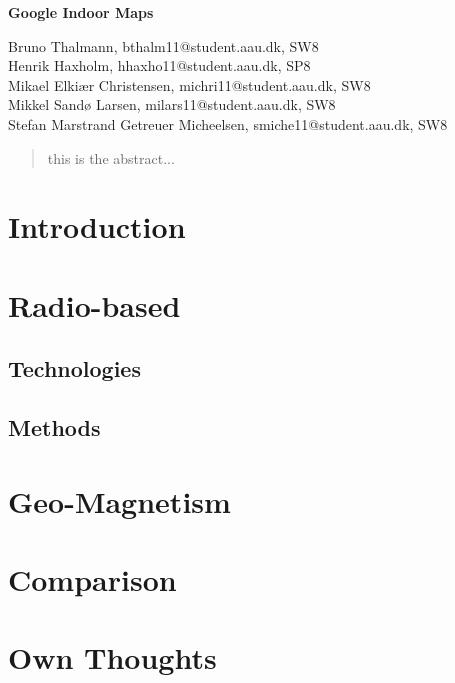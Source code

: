 \documentclass[12pt,a4paper]{article}
\begin{document}
\begin{center}
\bigskip\bigskip
{\Large\bf Google Indoor Maps}
\bigskip\bigskip


Bruno Thalmann, bthalm11@student.aau.dk, SW8\\
Henrik Haxholm, hhaxho11@student.aau.dk, SP8\\
Mikael Elkiær Christensen, michri11@student.aau.dk, SW8\\
Mikkel Sandø Larsen, milars11@student.aau.dk, SW8\\
Stefan Marstrand Getreuer Micheelsen, smiche11@student.aau.dk, SW8

\bigskip
\begin{abstract}
this is the abstract...
\end{abstract}

\thispagestyle{empty}
\end{center}


\titlepage



\thispagestyle{plain}


\section{Introduction}


\section{Radio-based}

\subsection{Technologies}




\subsection{Methods}






\section{Geo-Magnetism}


\section{Comparison}



\section{Own Thoughts}




\end{document}
